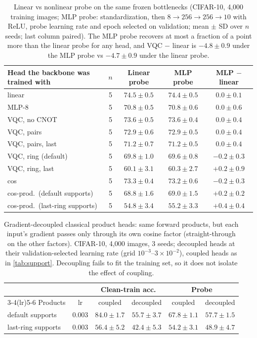 \begin{table}[h]
\centering
\caption{Linear vs nonlinear probe on the same frozen bottlenecks (CIFAR-10, 4,000 training
images; MLP probe: standardization, then $8\to256\to256\to10$ with ReLU, probe learning rate and
epoch selected on validation; mean $\pm$ SD over $n$ seeds; last column paired). The MLP probe
recovers at most a fraction of a point more than the linear probe for any head, and VQC $-$
linear is $-4.8 \pm 0.9$ under the MLP probe vs $-4.7 \pm 0.9$ under the linear
probe.}
\label{tab:mlpprobe}
\small
\begin{tabular}{lcccc}
\toprule
Head the backbone was trained with & $n$ & Linear probe & MLP probe & MLP $-$ linear \\
\midrule
linear & 5 & $74.5 \pm 0.5$ & $74.4 \pm 0.5$ & $0.0 \pm 0.1$ \\
MLP-8 & 5 & $70.8 \pm 0.5$ & $70.8 \pm 0.6$ & $0.0 \pm 0.6$ \\
VQC, no CNOT & 5 & $73.6 \pm 0.5$ & $73.6 \pm 0.4$ & $0.0 \pm 0.4$ \\
VQC, pairs & 5 & $72.9 \pm 0.6$ & $72.9 \pm 0.5$ & $0.0 \pm 0.4$ \\
VQC, pairs, last & 5 & $71.2 \pm 0.7$ & $71.2 \pm 0.5$ & $0.0 \pm 0.4$ \\
VQC, ring (default) & 5 & $69.8 \pm 1.0$ & $69.6 \pm 0.8$ & $-0.2 \pm 0.3$ \\
VQC, ring, last & 5 & $60.1 \pm 3.1$ & $60.3 \pm 2.7$ & $+0.2 \pm 0.9$ \\
cos & 5 & $73.3 \pm 0.4$ & $73.2 \pm 0.6$ & $-0.2 \pm 0.3$ \\
cos-prod.\ (default supports) & 5 & $68.8 \pm 1.6$ & $69.0 \pm 1.5$ & $+0.2 \pm 0.2$ \\
cos-prod.\ (last-ring supports) & 5 & $54.8 \pm 3.4$ & $55.2 \pm 3.3$ & $+0.4 \pm 0.4$ \\
\bottomrule
\end{tabular}
\end{table}

\begin{table}[h]
\centering
\caption{Gradient-decoupled classical product heads: same forward products, but each
input's gradient passes only through its own cosine factor (straight-through on the other
factors). CIFAR-10, 4,000 images, 3 seeds; decoupled heads at their validation-selected
learning rate (grid $10^{-3}$--$3\times10^{-2}$), coupled heads as in \cref{tab:support}.
Decoupling fails to fit the training set, so it does not isolate the effect of coupling.}
\label{tab:decoupled}
\small
\begin{tabular}{lccccc}
\toprule
& & \multicolumn{2}{c}{Clean-train acc.} & \multicolumn{2}{c}{Probe} \\
\cmidrule(lr){3-4}\cmidrule(lr){5-6}
Products & lr & coupled & decoupled & coupled & decoupled \\
\midrule
default supports & 0.003 & $84.0 \pm 1.7$ & $55.7 \pm 3.7$ & $67.8 \pm 1.1$ & $57.7 \pm 1.5$ \\
last-ring supports & 0.003 & $56.4 \pm 5.2$ & $42.4 \pm 5.3$ & $54.2 \pm 3.1$ & $48.9 \pm 4.7$ \\
\bottomrule
\end{tabular}
\end{table}

